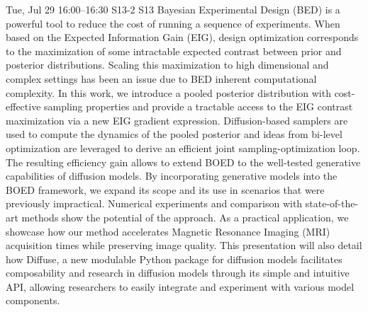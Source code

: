 \begin{talk}
  {}%
  {}%
  {}%
  {}%
  {}%
  {}%
  {Tue, Jul 29 16:00–16:30}%
  {S13-2}%
  {S13}%
    Bayesian  Experimental Design (BED) is a powerful tool to reduce the cost of running a sequence of experiments.
    When based on the Expected Information Gain (EIG), design optimization corresponds to the maximization of some intractable expected  contrast between prior and posterior distributions.
    Scaling this maximization to high dimensional and complex settings has been an issue due to BED inherent computational complexity.
    In this work, we introduce a pooled posterior distribution with cost-effective sampling properties and provide a tractable access to the EIG contrast maximization via a new EIG gradient expression. Diffusion-based samplers are used to compute the dynamics of the pooled posterior and ideas from bi-level optimization are leveraged to derive an efficient joint sampling-optimization loop.
    The resulting efficiency gain allows to extend BOED to the well-tested generative capabilities of diffusion models.
    By incorporating generative models into the BOED framework, we expand its scope and its use in scenarios that were previously impractical. Numerical experiments and comparison with state-of-the-art methods show the potential of the approach.
    As a practical application, we showcase how our method accelerates Magnetic Resonance Imaging (MRI) acquisition times while preserving image quality.
    This presentation will also detail how Diffuse, a new modulable Python package for diffusion models facilitates composability and research in diffusion models through its simple and intuitive API, allowing researchers to easily integrate and experiment with various model components.

\end{talk}

